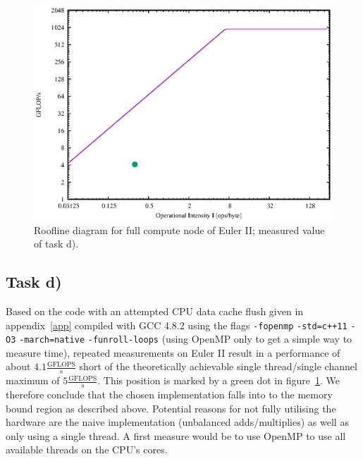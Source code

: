 \documentclass[11pt,a4paper]{article}
\begin{document}
\begin{figure}[ht]
\begin{center}
\includegraphics[scale=0.9]{roofline.eps} 
\end{center}
\caption{Roofline diagram for full compute node of Euler II; measured value of task d).}
\label{fig:roofline}
\end{figure}

\subsection{Task d)}
Based on the code with an attempted CPU data cache flush given in appendix~\ref{app} compiled with GCC 4.8.2 using the flags \lstinline{-fopenmp} \lstinline{-std=c++11} \lstinline{-O3} \lstinline{-march=native} \lstinline{-funroll-loops} (using OpenMP only to get a simple way to measure time), repeated measurements on Euler II result in a performance of about $4.1 \frac{\text{GFLOPS}}{s}$ short of the theoretically achievable single thread/single channel maximum of $5 \frac{\text{GFLOPS}}{s}$. This position is marked by a green dot in figure~\ref{fig:roofline}. We therefore conclude that the chosen implementation falls into to the memory bound region as described above. Potential reasons for not fully utilising the hardware are the naive implementation (unbalanced adds/multiplies) as well as only using a single thread. A first measure would be to use OpenMP to use all available threads on the CPU's cores.
\end{document}
